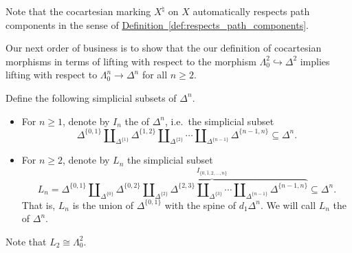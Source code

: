 \documentclass[main.tex]{subfiles}
\begin{document}
Note that the cocartesian marking $X^{\natural}$ on $X$ automatically respects path components in the sense of \hyperref[def:respects_path_components]{Definition~\ref*{def:respects_path_components}}.

Our next order of business is to show that the our definition of cocartesian morphisms in terms of lifting with respect to the morphism $\Lambda^{2}_{0} \hookrightarrow \Delta^{2}$ implies lifting with respect to $\Lambda^{n}_{0} \to \Delta^{n}$ for all $n \geq 2$.

\begin{definition}
  Define the following simplicial subsets of $\Delta^{n}$.
  \begin{itemize}
    \item For $n \geq 1$, denote by $I_{n}$ the  of $\Delta^{n}$, i.e.\ the simplicial subset
      \begin{equation*}
        \Delta^{\{0, 1\}} \amalg_{\Delta^{\{1\}}} \Delta^{\{1, 2\}} \amalg_{\Delta^{\{2\}}} \cdots \amalg_{\Delta^{\{n-1\}}} \Delta^{\{n-1, n\}} \subseteq \Delta^{n}.
      \end{equation*}

    \item For $n \geq 2$, denote by $L_{n}$ the simplicial subset
      \begin{equation*}
        L_{n} = \Delta^{\{0, 1\}} \amalg_{\Delta^{\{0\}}} \overbrace{\Delta^{\{0, 2\}} \amalg_{\Delta^{\{2\}}} \Delta^{\{2, 3\}} \amalg_{\Delta^{\{3\}}}\cdots \amalg_{\Delta^{\{n-1\}}} \Delta^{\{n-1, n\}}}^{I_{\{0, \hat{1}, 2, \ldots, n\}}} \subseteq \Delta^{n}.
      \end{equation*}
      That is, $L_{n}$ is the union of $\Delta^{\{0, 1\}}$ with the spine of $d_{1}\Delta^{n}$. We will call $L_{n}$ the  of $\Delta^{n}$.
  \end{itemize}
\end{definition}

Note that $L_{2} \cong \Lambda^{2}_{0}$.

\end{document}
